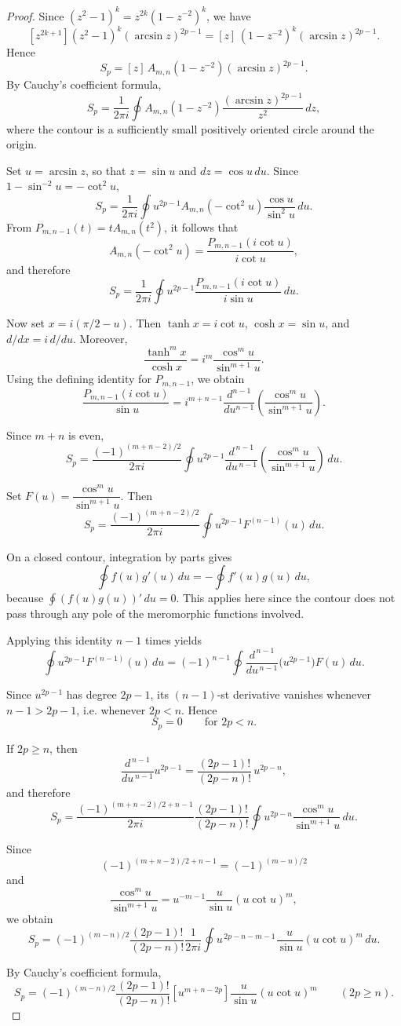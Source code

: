 \documentclass[11pt,twoside]{article}
\numberwithin{equation}{section}
\begin{document}
\begin{proof}
Since \((z^2-1)^k=z^{2k}(1-z^{-2})^k\), we have
\[
[z^{2k+1}]
(z^2-1)^k(\arcsin z)^{2p-1}
=
[z]\,(1-z^{-2})^k(\arcsin z)^{2p-1}.
\]
Hence
\[
S_p
=
[z]\,
A_{m,n}(1-z^{-2})(\arcsin z)^{2p-1}.
\]
By Cauchy's coefficient formula,
\[
S_p
=
\frac{1}{2\pi i}
\oint
A_{m,n}(1-z^{-2})
\frac{(\arcsin z)^{2p-1}}{z^2}\,dz,
\]
where the contour is a sufficiently small positively oriented circle
around the origin.

Set \(u=\arcsin z\), so that \(z=\sin u\) and
\(dz=\cos u\,du\). Since \(1-\sin^{-2}u=-\cot^2u\),
\[
S_p
=
\frac{1}{2\pi i}
\oint
u^{2p-1}A_{m,n}(-\cot^2u)
\frac{\cos u}{\sin^2u}\,du.
\]
From \(P_{m,n-1}(t)=tA_{m,n}(t^2)\), it follows that
\[
A_{m,n}(-\cot^2u)
=
\frac{P_{m,n-1}(i\cot u)}{i\cot u},
\]
and therefore
\[
S_p
=
\frac{1}{2\pi i}
\oint
u^{2p-1}
\frac{P_{m,n-1}(i\cot u)}{i\sin u}\,du.
\]

Now set \(x=i(\pi/2-u)\). Then
\(\tanh x=i\cot u\), \(\cosh x=\sin u\), and
\(d/dx=i\,d/du\). Moreover,
\[
\frac{\tanh^m x}{\cosh x}
=
i^m\frac{\cos^m u}{\sin^{m+1}u}.
\]
Using the defining identity for \(P_{m,n-1}\), we obtain
\[
\frac{P_{m,n-1}(i\cot u)}{\sin u}
=
i^{m+n-1}
\frac{d^{n-1}}{du^{n-1}}
\left(
\frac{\cos^m u}{\sin^{m+1}u}
\right).
\]

Since \(m+n\) is even,
\[
S_p
=
\frac{(-1)^{(m+n-2)/2}}{2\pi i}
\oint
u^{2p-1}
\frac{d^{\,n-1}}{du^{\,n-1}}
\left(
\frac{\cos^m u}{\sin^{m+1}u}
\right)\,du.
\]

Set \(F(u)=\dfrac{\cos^m u}{\sin^{m+1}u}\). Then
\[
S_p
=
\frac{(-1)^{(m+n-2)/2}}{2\pi i}
\oint u^{2p-1}F^{(n-1)}(u)\,du.
\]

On a closed contour, integration by parts gives
\[
\oint f(u)g'(u)\,du=-\oint f'(u)g(u)\,du,
\]
because \(\displaystyle\oint (f(u)g(u))'\,du=0\). This applies here since the contour
does not pass through any pole of the meromorphic functions involved.

Applying this identity \(n-1\) times yields
\[
\oint u^{2p-1}F^{(n-1)}(u)\,du
=
(-1)^{n-1}
\oint
\frac{d^{\,n-1}}{du^{\,n-1}}
\bigl(u^{2p-1}\bigr)
F(u)\,du.
\]

Since \(u^{2p-1}\) has degree \(2p-1\), its \((n-1)\)-st derivative
vanishes whenever \(n-1>2p-1\), i.e. whenever \(2p<n\). Hence
\[
\boxed{S_p=0 \qquad \text{for } 2p<n.}
\]

If \(2p\ge n\), then
\[
\frac{d^{\,n-1}}{du^{\,n-1}}u^{2p-1}
=
\frac{(2p-1)!}{(2p-n)!}\,u^{2p-n},
\]
and therefore
\[
S_p
=
\frac{(-1)^{(m+n-2)/2+n-1}}{2\pi i}
\frac{(2p-1)!}{(2p-n)!}
\oint
u^{2p-n}
\frac{\cos^m u}{\sin^{m+1}u}\,du.
\]

Since
\[
(-1)^{(m+n-2)/2+n-1}
=
(-1)^{(m-n)/2}
\]
and
\[
\frac{\cos^m u}{\sin^{m+1}u}
=
u^{-m-1}
\frac{u}{\sin u}(u\cot u)^m,
\]
we obtain
\[
S_p
=
(-1)^{(m-n)/2}
\frac{(2p-1)!}{(2p-n)!}
\frac{1}{2\pi i}
\oint
u^{\,2p-n-m-1}
\frac{u}{\sin u}(u\cot u)^m\,du.
\]

By Cauchy's coefficient formula,
\[
\boxed{
S_p
=
(-1)^{(m-n)/2}
\frac{(2p-1)!}{(2p-n)!}
[u^{m+n-2p}]
\frac{u}{\sin u}(u\cot u)^m
}
\qquad (2p\ge n).
\]

\end{proof}
\end{document}
